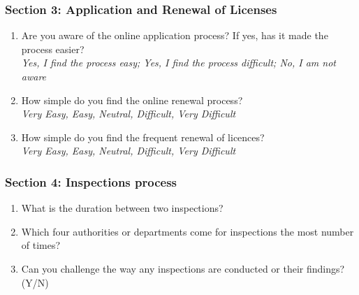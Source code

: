 \documentclass[a4paper, 12pt]{article}
\begin{document}
	\subsubsection* {Section 3: Application and Renewal of Licenses}
		\begin {enumerate}[-,nosep]
		\item Are you aware of the online application process? If yes, has it made the process easier?\\
		\textit{Yes, I find the process easy; Yes, I find the process difficult; No, I am not aware}\\
		\item How simple do you find the online renewal process?\\
		\textit{Very Easy, Easy, Neutral, Difficult, Very Difficult}\\
		\item How simple do you find the frequent renewal of licences?\\
		\textit{Very Easy, Easy, Neutral, Difficult, Very Difficult}
		\end {enumerate}

	\subsubsection* {Section 4: Inspections process}
		\begin {enumerate} [-,nosep]
		\item What is the duration between two inspections?
		\item Which four authorities or departments come for inspections the most number of times?
		\item Can you challenge the way any inspections are conducted or their findings? (Y/N)
		\end {enumerate} 
\end{document}
